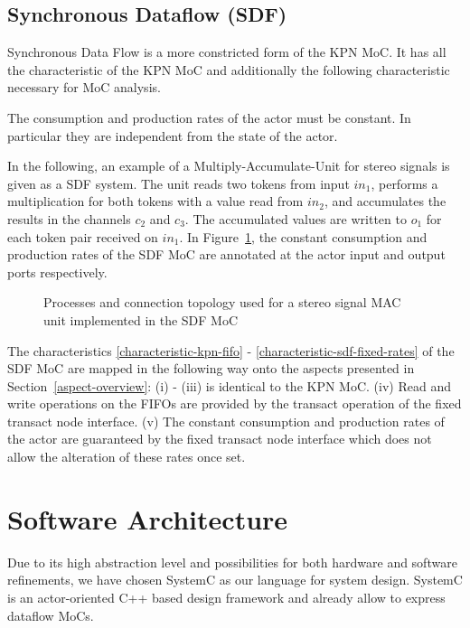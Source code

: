 \subsection{Synchronous Dataflow (SDF)}
Synchronous Data Flow \cite{Lee87b:1987} is a more constricted form of the
KPN MoC. It has all the characteristic of the KPN MoC and additionally the
following characteristic necessary for MoC analysis.

\begin{characteristic}\label{characteristic-sdf-fixed-rates}
The consumption and production rates of the actor must be constant.
In particular they are independent from the state of the actor.
\end{characteristic}

In the following, an example of a Multiply-Accumulate-Unit for stereo signals is given
as a SDF system. The unit reads two tokens from input $in_1$,
performs a multiplication for both tokens with a value read from $in_2$,
and accumulates the results in the channels $c_2$ and
$c_3$. The accumulated values are written to $o_1$ for each
token pair received on $in_1$.
In Figure~\ref{fig:sdf-mac-unit},
the constant consumption and production rates of the SDF
MoC are annotated at the actor input and output ports
respectively.

\begin{figure}[h]
\centering

\caption{Processes and connection topology used for a stereo signal MAC
  unit implemented in the SDF MoC}
\label{fig:sdf-mac-unit}
\end{figure}

The characteristics \ref{characteristic-kpn-fifo} -
\ref{characteristic-sdf-fixed-rates} of the SDF MoC are mapped in the following way
onto the aspects presented in Section~\ref{aspect-overview}: (i) - (iii) is identical
to the KPN MoC.
(iv) Read and write operations on the FIFOs are provided by the transact
operation of the fixed transact node interface.
(v) The constant consumption and production rates of the actor are
guaranteed by the fixed transact node interface which does
not allow the alteration of these rates once set.

\section{Software Architecture}\label{software-architecture}

Due to its high abstraction level and possibilities for both
hardware and software refinements, we have chosen SystemC
\cite{systemc-lrm:2003} \cite{glms:2002} as our language for system design.
SystemC is an actor-oriented C++ based design framework and
already allow to express dataflow MoCs. 

